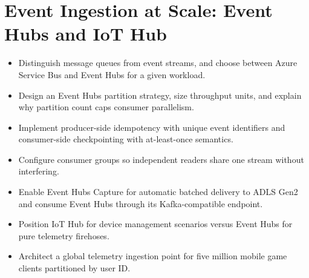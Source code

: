 \chapter{Event Ingestion at Scale: Event Hubs and IoT Hub}
%
\begin{objectives}
\begin{itemize}
    \item Distinguish message queues from event streams, and choose between Azure Service Bus and Event Hubs for a given workload.
    \item Design an Event Hubs partition strategy, size throughput units, and explain why partition count caps consumer parallelism.
    \item Implement producer-side idempotency with unique event identifiers and consumer-side checkpointing with at-least-once semantics.
    \item Configure consumer groups so independent readers share one stream without interfering.
    \item Enable Event Hubs Capture for automatic batched delivery to ADLS Gen2 and consume Event Hubs through its Kafka-compatible endpoint.
    \item Position IoT Hub for device management scenarios versus Event Hubs for pure telemetry firehoses.
    \item Architect a global telemetry ingestion point for five million mobile game clients partitioned by user ID.
\end{itemize}
\end{objectives}


